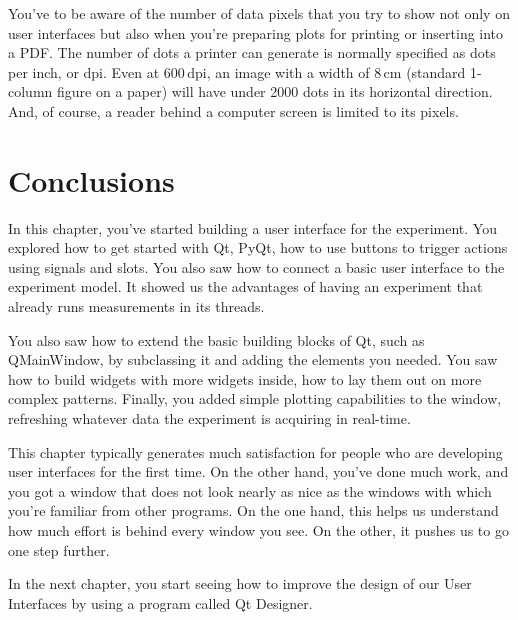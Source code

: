 You've to be aware of the number of data pixels that you try to show not only on user interfaces but also when you're preparing plots for printing or inserting into a PDF. The number of dots a printer can generate is normally specified as dots per inch, or dpi. Even at $600\,\textrm{dpi}$, an image with a width of $8\,\textrm{cm}$ (standard 1-column figure on a paper) will have under 2000 dots in its horizontal direction. And, of course, a reader behind a computer screen is limited to its pixels.

\section{Conclusions}\label{sec:basic-gui-conclusions}
In this chapter, you've started building a user interface for the experiment. You explored how to get started with Qt, PyQt, how to use buttons to trigger actions using signals and slots. You also saw how to connect a basic user interface to the experiment model. It showed us the advantages of having an experiment that already runs measurements in its threads.

You also saw how to extend the basic building blocks of Qt, such as QMainWindow, by subclassing it and adding the elements you needed. You saw how to build widgets with more widgets inside, how to lay them out on more complex patterns. Finally, you added simple plotting capabilities to the window, refreshing whatever data the experiment is acquiring in real-time.

This chapter typically generates much satisfaction for people who are developing user interfaces for the first time. On the other hand, you've done much work, and you got a window that does not look nearly as nice as the windows with which you're familiar from other programs. On the one hand, this helps us understand how much effort is behind every window you see. On the other, it pushes us to go one step further.

In the next chapter, you start seeing how to improve the design of our User Interfaces by using a program called Qt Designer.
